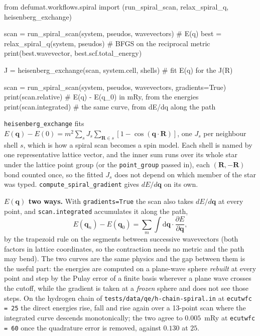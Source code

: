 \documentclass[11pt,a4paper]{article}
\newcommand{\code}[1]{\texttt{\small #1}}
\begin{document}
\begin{pycode}
from defumat.workflows.spiral import (run_spiral_scan, relax_spiral_q,
                                       heisenberg_exchange)

scan = run_spiral_scan(system, pseudos, wavevectors)   # E(q)
best = relax_spiral_q(system, pseudos)   # BFGS on the reciprocal metric
print(best.wavevector, best.scf.total_energy)

J = heisenberg_exchange(scan, system.cell, shells)   # fit E(q) for the J(R)

scan = run_spiral_scan(system, pseudos, wavevectors, gradients=True)
print(scan.relative)     # E(q) - E(q_0) in mRy, from the energies
print(scan.integrated)   # the same curve, from dE/dq along the path
\end{pycode}

\code{heisenberg\_exchange} fits
$E(\mathbf q) - E(0) = m^2 \sum_{s} J_s \sum_{\mathbf R \in s}[1 - \cos(\mathbf q\cdot\mathbf R)]$,
one $J_s$ per neighbour shell $s$, which is how a spiral scan becomes a spin
model. Each shell is named by one representative lattice vector, and the inner
sum runs over its whole star under the lattice point group (or the
\code{point\_group} passed in), each $(\mathbf R, -\mathbf R)$ bond counted
once, so the fitted $J_s$ does not depend on which member of the star was
typed.
\code{compute\_spiral\_gradient} gives $dE/d\mathbf q$ on its own.

\textbf{$E(\mathbf q)$ two ways.} With \code{gradients=True} the scan also takes
$dE/d\mathbf q$ at every point, and \code{scan.integrated} accumulates it along
the path,
\begin{equation*}
E(\mathbf q_n) - E(\mathbf q_0)
  = \sum_m \int \mathrm d\mathbf q\cdot\frac{\partial E}{\partial\mathbf q},
\end{equation*}
by the trapezoid rule on the segments between successive wavevectors (both
factors in lattice coordinates, so the contraction needs no metric and the path
may bend). The two curves are the same physics and the gap between them is the
useful part: the energies are computed on a plane-wave sphere \emph{rebuilt} at
every point and step by the Pulay error of a finite basis wherever a plane wave
crosses the cutoff, while the gradient is taken at a \emph{frozen} sphere and
does not see those steps. On the hydrogen chain of
\code{tests/data/qe/h-chain-spiral.in} at \code{ecutwfc = 25} the direct
energies rise, fall and rise again over a 13-point scan where the integrated
curve descends monotonically; the two agree to $0.005$~mRy at
\code{ecutwfc = 60} once the quadrature error is removed, against $0.130$ at
$25$.
\end{document}
